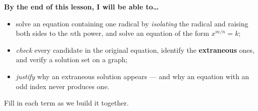 \documentclass[10pt]{article}
\begin{document}
\namedateperiod

\vspace{0.08in}

\begin{objectivebox}
\textbf{By the end of this lesson, I will be able to\dots}
\begin{itemize}\setlength{\itemsep}{2pt}
  \item solve an equation containing one radical by \emph{isolating} the radical and raising both sides to the $n$th power, and solve an equation of the form $x^{m/n}=k$;
  \item \emph{check} every candidate in the original equation, identify the \textbf{extraneous} ones, and verify a solution set on a graph;
  \item \emph{justify} why an extraneous solution appears --- and why an equation with an odd index never produces one.
\end{itemize}
\end{objectivebox}

\vspace{0.05in}

\begin{vocabbox}
\small
Fill in each term as we build it together.
\par\vspace{2pt}   %
\end{vocabbox}
\end{document}
